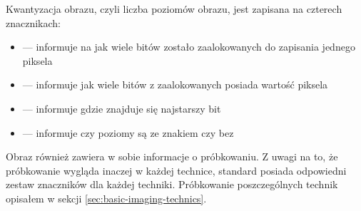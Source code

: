 \dicomRetired

\par
Kwantyzacja obrazu, czyli liczba poziomów obrazu, jest zapisana na czterech znacznikach:
\begin{itemize}
    \item {} --- informuje na jak wiele bitów zostało zaalokowanych do zapisania jednego piksela
    \item {} --- informuje jak wiele bitów z zaalokowanych posiada wartość piksela
    \item {} --- informuje gdzie znajduje się najstarszy bit
    \item {} --- informuje czy poziomy są ze znakiem czy bez
\end{itemize}

\par
Obraz \DICOM również zawiera w sobie informacje o próbkowaniu.
Z uwagi na to, że próbkowanie wygląda inaczej w każdej technice, standard posiada odpowiedni zestaw znaczników dla każdej techniki.
Próbkowanie poszczególnych technik opisałem w sekcji \ref{sec:basic-imaging-technics}.







